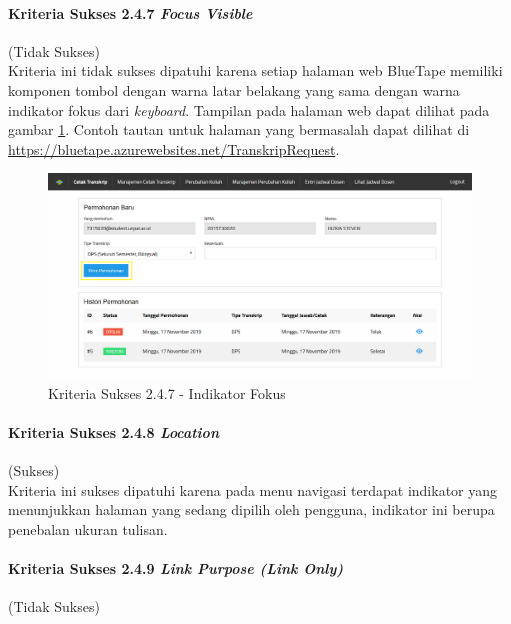 \documentclass[a4paper,twoside]{article}
\begin{document}
\begin{enumerate}
		\paragraph{Kriteria Sukses 2.4.7 \textit{Focus Visible}}
		\label{par:kepatuhan_bluetape_kriteria_sukses_2.4.7}
		(Tidak Sukses)\\

		Kriteria ini tidak sukses dipatuhi karena setiap halaman web BlueTape memiliki komponen tombol dengan warna latar belakang yang sama dengan warna indikator fokus dari \textit{keyboard}. Tampilan pada halaman web dapat dilihat pada gambar \ref{fig:2.4.7_focus_visible}. Contoh tautan untuk halaman yang bermasalah dapat dilihat di \url{https://bluetape.azurewebsites.net/TranskripRequest}. 

		\begin{figure}[H]
			\centering  
			\includegraphics[scale=0.3, frame]{kriteria-sukses-2-4-7-focus-visible}  
			\caption[Kriteria Sukses 2.4.7 - Indikator Fokus]{Kriteria Sukses 2.4.7 - Indikator Fokus}
			\label{fig:2.4.7_focus_visible}  
		\end{figure}
		
		\paragraph{Kriteria Sukses 2.4.8 \textit{Location}}
		\label{par:kepatuhan_bluetape_kriteria_sukses_2.4.8}
		(Sukses)\\

		Kriteria ini sukses dipatuhi karena pada menu navigasi terdapat indikator yang menunjukkan halaman yang sedang dipilih oleh pengguna, indikator ini berupa penebalan ukuran tulisan.

		\paragraph{Kriteria Sukses 2.4.9 \textit{Link Purpose (Link Only)}}
		\label{par:kepatuhan_bluetape_kriteria_sukses_2.4.9}
		(Tidak Sukses)\\


\end{enumerate}
\end{document}

